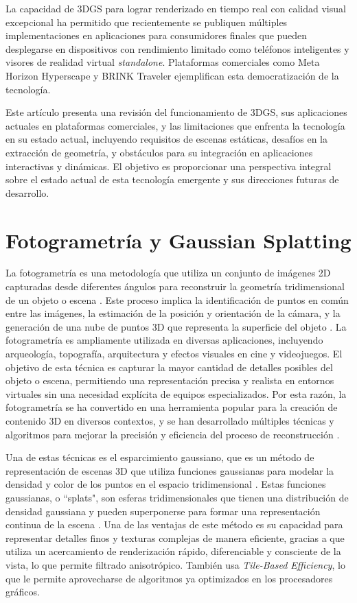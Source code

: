 \documentclass[lettersize,journal]{IEEEtran}
\begin{document}
La capacidad de 3DGS para lograr renderizado en tiempo real con calidad visual excepcional ha permitido que recientemente se publiquen múltiples implementaciones en aplicaciones para consumidores finales que pueden desplegarse en dispositivos con rendimiento limitado como teléfonos inteligentes y visores de realidad virtual \textit{standalone}. Plataformas comerciales como Meta Horizon Hyperscape \cite{MetaHorizon} y BRINK Traveler \cite{BrinkXR} ejemplifican esta democratización de la tecnología.

Este artículo presenta una revisión del funcionamiento de 3DGS, sus aplicaciones actuales en plataformas comerciales, y las limitaciones que enfrenta la tecnología en su estado actual, incluyendo requisitos de escenas estáticas, desafíos en la extracción de geometría, y obstáculos para su integración en aplicaciones interactivas y dinámicas. El objetivo es proporcionar una perspectiva integral sobre el estado actual de esta tecnología emergente y sus direcciones futuras de desarrollo. 

\section{Fotogrametría y Gaussian Splatting}
La fotogrametría es una metodología que utiliza un conjunto de imágenes 2D capturadas desde diferentes ángulos para reconstruir la geometría tridimensional de un objeto o escena \cite{Matias2025}. Este proceso implica la identificación de puntos en común entre las imágenes, la estimación de la posición y orientación de la cámara, y la generación de una nube de puntos 3D que representa la superficie del objeto \cite{Luhmann2019}. La fotogrametría es ampliamente utilizada en diversas aplicaciones, incluyendo arqueología, topografía, arquitectura y efectos visuales en cine y videojuegos\cite{MetaHorizon, Scaniverse, BrinkXR}. El objetivo de esta técnica es capturar la mayor cantidad de detalles posibles del objeto o escena, permitiendo una representación precisa y realista en entornos virtuales \cite{Luhmann2019} sin una necesidad explícita de equipos especializados. Por esta razón, la fotogrametría se ha convertido en una herramienta popular para la creación de contenido 3D en diversos contextos, y se han desarrollado múltiples técnicas y algoritmos para mejorar la precisión y eficiencia del proceso de reconstrucción \cite{Matias2025}.

Una de estas técnicas es el esparcimiento gaussiano, que es un método de representación de escenas 3D que utiliza funciones gaussianas para modelar la densidad y color de los puntos en el espacio tridimensional \cite{Kerbl2023}. Estas funciones gaussianas, o ``splats", son esferas tridimensionales que tienen una distribución de densidad gaussiana y pueden superponerse para formar una representación continua de la escena \cite{Matias2025}.  Una de las ventajas de este método es su capacidad para representar detalles finos y texturas complejas de manera eficiente, gracias a que utiliza un acercamiento de renderización rápido, diferenciable y consciente de la vista, lo que permite filtrado anisotrópico. También usa \textit{Tile-Based Efficiency}, lo que le permite aprovecharse de algoritmos ya optimizados en los procesadores gráficos\cite{Kerbl2023}.
\end{document}
